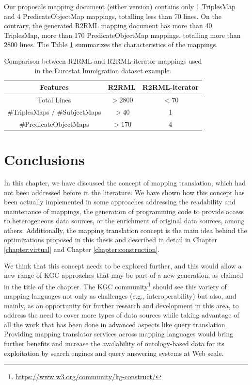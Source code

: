 Our proposals mapping document (either version) contains only 1 TriplesMap and 4 PredicateObjectMap mappings, totalling less than 70 lines. On the contrary, the generated R2RML mapping document has more than 40 TriplesMap, more than 170 PredicateObjectMap mappings, totalling more than 2800 lines. The Table \ref{table:compare2} summarizes the characteristics of the mappings.
\begin{table}[tbp]
\caption[R2RML vs R2RML-iterator in Eurostat dataset]{Comparison between R2RML and R2RML-iterator mappings used in the Eurostat Immigration dataset example.}
\label{table:compare2}
\begin{tabular}{c|c|c}
\hline
\textbf{Features} & \textbf{R2RML}   & \textbf{R2RML-iterator}  \\ \hline
Total Lines   & $>$2800 & $<$70 \\ 
\#TriplesMaps / \#SubjectMaps     & $>$40                & 1           \\
\#PredicateObjectMaps  & $>$170              & 4            \\ \hline
\end{tabular}
\end{table}


\section{Conclusions}

In this chapter, we have discussed the concept of mapping translation, which had not been addressed before in the literature. We have shown how this concept has been actually implemented in some approaches addressing the readability and maintenance of mappings, the generation of programming code to provide access to heterogeneous data sources, or the enrichment of original data sources, among others. Additionally, the mapping translation concept is the main idea behind the optimizations proposed in this thesis and described in detail in Chapter \ref{chapter:virtual} and Chapter \ref{chapter:construction}.

We think that this concept needs to be explored further, and this would allow a new range of KGC approaches that may be part of a new generation, as claimed in the title of the chapter. The KGC community\footnote{\url{https://www.w3.org/community/kg-construct/}} should see this variety of mapping languages not only as challenges (e.g., interoperability) but also, and mainly, as an opportunity for further research and development in this area, to address the need to cover more types of data sources while taking advantage of all the work that has been done in advanced aspects like query translation. Providing mapping translator services across mapping languages would bring further benefits and increase the availability of ontology-based data for its exploitation by search engines and query answering systems at Web scale.